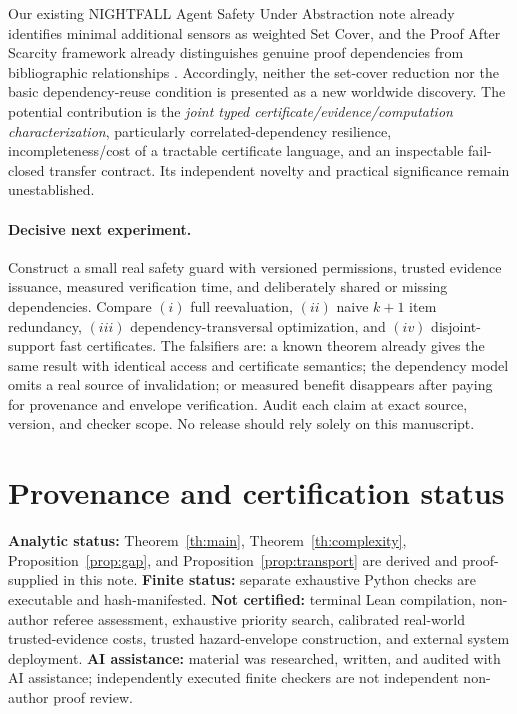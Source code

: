 \documentclass[11pt]{article}
\begin{document}
Our existing NIGHTFALL Agent Safety Under Abstraction note already identifies minimal additional sensors as weighted Set Cover, and the Proof After Scarcity framework already distinguishes genuine proof dependencies from bibliographic relationships \cite{nightfall2026}. Accordingly, neither the set-cover reduction nor the basic dependency-reuse condition is presented as a new worldwide discovery. The potential contribution is the \emph{joint typed certificate/evidence/computation characterization}, particularly correlated-dependency resilience, incompleteness/cost of a tractable certificate language, and an inspectable fail-closed transfer contract. Its independent novelty and practical significance remain unestablished.

\paragraph{Decisive next experiment.} Construct a small real safety guard with versioned permissions, trusted evidence issuance, measured verification time, and deliberately shared or missing dependencies. Compare $(i)$ full reevaluation, $(ii)$ naive $k+1$ item redundancy, $(iii)$ dependency-transversal optimization, and $(iv)$ disjoint-support fast certificates. The falsifiers are: a known theorem already gives the same result with identical access and certificate semantics; the dependency model omits a real source of invalidation; or measured benefit disappears after paying for provenance and envelope verification. Audit each claim at exact source, version, and checker scope. No release should rely solely on this manuscript.

\section*{Provenance and certification status}
\textbf{Analytic status:} Theorem~\ref{th:main}, Theorem~\ref{th:complexity}, Proposition~\ref{prop:gap}, and Proposition~\ref{prop:transport} are derived and proof-supplied in this note. \textbf{Finite status:} separate exhaustive Python checks are executable and hash-manifested. \textbf{Not certified:} terminal Lean compilation, non-author referee assessment, exhaustive priority search, calibrated real-world trusted-evidence costs, trusted hazard-envelope construction, and external system deployment. \textbf{AI assistance:} material was researched, written, and audited with AI assistance; independently executed finite checkers are not independent non-author proof review.
\end{document}
